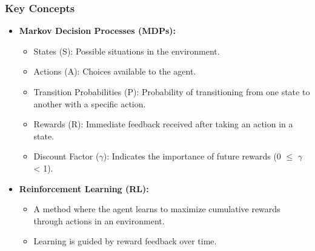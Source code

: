 \documentclass[aspectratio=169]{beamer}
\begin{document}
\begin{frame}[fragile]
    \frametitle{Key Concepts}
    \begin{itemize}
        \item \textbf{Markov Decision Processes (MDPs):}
        \begin{itemize}
            \item States (S): Possible situations in the environment.
            \item Actions (A): Choices available to the agent.
            \item Transition Probabilities (P): Probability of transitioning from one state to another with a specific action.
            \item Rewards (R): Immediate feedback received after taking an action in a state.
            \item Discount Factor ($\gamma$): Indicates the importance of future rewards (0 $\leq$ $\gamma$ < 1).
        \end{itemize}
        
        \item \textbf{Reinforcement Learning (RL):}
        \begin{itemize}
            \item A method where the agent learns to maximize cumulative rewards through actions in an environment.
            \item Learning is guided by reward feedback over time.
        \end{itemize}
    \end{itemize}
\end{frame}
\end{document}
